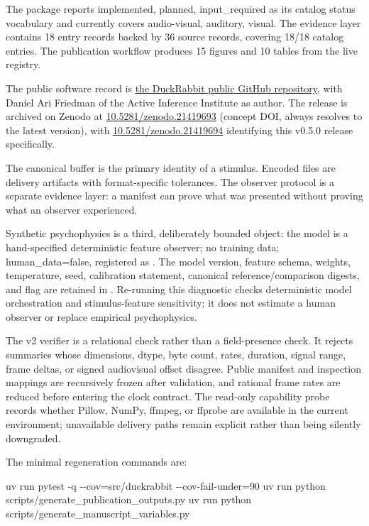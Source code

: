 \documentclass[
  english,
]{article}
\newenvironment{Shaded}{}{}
\newcommand{\AttributeTok}[1]{\textcolor[rgb]{0.49,0.56,0.16}{#1}}
\newcommand{\ExtensionTok}[1]{#1}
\newcommand{\NormalTok}[1]{#1}
\newcommand{\OperatorTok}[1]{\textcolor[rgb]{0.40,0.40,0.40}{#1}}
\begin{document}
The package reports implemented, planned, input\_required as its catalog
status vocabulary and currently covers audio-visual, auditory, visual.
The evidence layer contains 18 entry records backed by 36 source
records, covering 18/18 catalog entries. The publication workflow
produces 15 figures and 10 tables from the live registry.

The public software record is
\href{https://github.com/docxology/DuckRabbit}{the DuckRabbit public
GitHub repository}, with Daniel Ari Friedman of the Active Inference
Institute as author. The release is archived on Zenodo at
\href{https://doi.org/10.5281/zenodo.21419693}{10.5281/zenodo.21419693}
(concept DOI, always resolves to the latest version), with
\href{https://doi.org/10.5281/zenodo.21419694}{10.5281/zenodo.21419694}
identifying this v0.5.0 release specifically.

The canonical buffer is the primary identity of a stimulus. Encoded
files are delivery artifacts with format-specific tolerances. The
observer protocol is a separate evidence layer: a manifest can prove
what was presented without proving what an observer experienced.

Synthetic psychophysics is a third, deliberately bounded object: the
model is a hand-specified deterministic feature observer; no training
data; human\_data=false, registered as
. The model version,
feature schema, weights, temperature, seed, calibration statement,
canonical reference/comparison digests, and 
flag are retained in .
Re-running this diagnostic checks deterministic model orchestration and
stimulus-feature sensitivity; it does not estimate a human observer or
replace empirical psychophysics.

The v2 verifier is a relational check rather than a field-presence
check. It rejects summaries whose dimensions, dtype, byte count, rates,
duration, signal range, frame deltas, or signed audiovisual offset
disagree. Public manifest and inspection mappings are recursively frozen
after validation, and rational frame rates are reduced before entering
the clock contract. The read-only capability probe records whether
Pillow, NumPy, ffmpeg, or ffprobe are available in the current
environment; unavailable delivery paths remain explicit rather than
being silently downgraded.

The minimal regeneration commands are:

\begin{Shaded}
\begin{Highlighting}[]
\ExtensionTok{uv}\NormalTok{ run pytest }\AttributeTok{{-}q} \AttributeTok{{-}{-}cov}\OperatorTok{=}\NormalTok{src/duckrabbit }\AttributeTok{{-}{-}cov{-}fail{-}under}\OperatorTok{=}\NormalTok{90}
\ExtensionTok{uv}\NormalTok{ run python scripts/generate\_publication\_outputs.py}
\ExtensionTok{uv}\NormalTok{ run python scripts/generate\_manuscript\_variables.py}
\end{Highlighting}
\end{Shaded}
\end{document}
